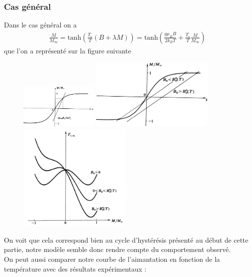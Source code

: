 \documentclass[12pt,prb,aps,epsf]{article}
\begin{document}
\subsubsection{Cas général}
Dans le cas général on a
\begin{eqnarray}
\frac{M}{M_{\infty}} = \mathrm{tanh}\left(\frac{T_c}{T}(B+\lambda M)\right) = \mathrm{tanh}\left(\frac{g\mu_BB}{2k_BT} + \frac{T_c}{T}\frac{M}{M_{\infty}}\right)
\end{eqnarray}
que l'on a représenté sur la figure suivante 
\begin{figure}[h]
	\centerline{\includegraphics[width=3.8cm,angle=90]{Mx2}
		\includegraphics[width=6cm]{def_B0}
		\includegraphics[width=5.5cm]{F_cas_general}}
\end{figure}
On voit que cela correspond bien au cycle d'hystérésis présenté au début de cette partie, notre modèle semble donc rendre compte du comportement observé. \\

On peut aussi comparer notre courbe de l'aimantation en fonction de la température avec des résultats expérimentaux :
\end{document}
